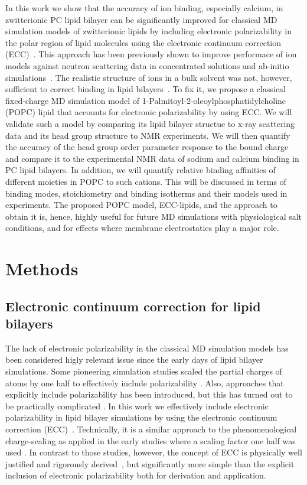 \documentclass[aip,jcp,twocolumn]{revtex4}
\begin{document}
In this work we show that the accuracy of ion binding, especially calcium,
in zwitterionic PC lipid bilayer can be significantly improved 
for classical MD simulation models of zwitterionic lipids
by including electronic polarizability
in the polar region of lipid molecules
using the electronic continuum correction (ECC)~\cite{leontyev11}. 
This approach has been previously shown to improve performace of
ion models against neutron scattering data in concentrated solutions 
and ab-initio simulations~\cite{Jungwirth2017,Jungwirth2015,kohagen14,kohagen16}. 
The realistic structure of ions in a bulk solvent was not, however, sufficient to correct binding in lipid
bilayers~\cite{catte16}. 
To fix it, we propose
a classical fixed-charge MD simulation model of 
1-Palmitoyl-2-oleoylphosphatidylcholine (POPC) lipid 
that accounts for electronic polarizability by using ECC. 
We will validate such a model by comparing its lipid bilayer structue
to x-ray scattering data and its head group structure to NMR experiments. 
We will then quantify the accuracy of the head group order parameter response to the bound charge
and compare it to the experimental NMR data of sodium and calcium binding in PC lipid bilayers. 
In addition, we will quantify relative binding affinities of different moieties in POPC to such cations. 
This will be discussed in terms of binding modes, stoichiometry and binding isotherms and their models used in experiments.
The proposed POPC model, ECC-lipids, and the approach to obtain it
is, hence, highly useful for future MD simulations with physiological salt conditions, 
and for effects where membrane electrostatics play a major role.




\section{Methods}

\subsection{Electronic continuum correction for lipid bilayers}
The lack of electronic polarizability in the classical MD simulation
models has been considered higly relevant issue since the early days of
lipid bilayer simulations. Some pioneering simulation studies scaled
the partial charges of atoms by one half to effectively include 
polarizability \cite{jonsson86,egberts94}. Also, approaches that
explicitly include polarizability has been introduced, but
this has turned out to be practically complicated \cite{chowdhary13}.
In this work we effectively include electronic polarizability in lipid
bilayer simulations by using the electronic continuum correction
(ECC)~\cite{leontyev11}. 
Technically, it is a similar approach to the phenomenological charge-scaling as applied in 
the early studies where a scaling factor one half was used \cite{jonsson86,egberts94}. 
In contrast to those studies, however, the concept of ECC is 
physically well justified and rigorously derived~\cite{leontyev09, leontyev10, leontyev11},
but significantly more simple than the explicit inclusion of electronic
polarizability \cite{chowdhary13} both for derivation and application.
\end{document}
